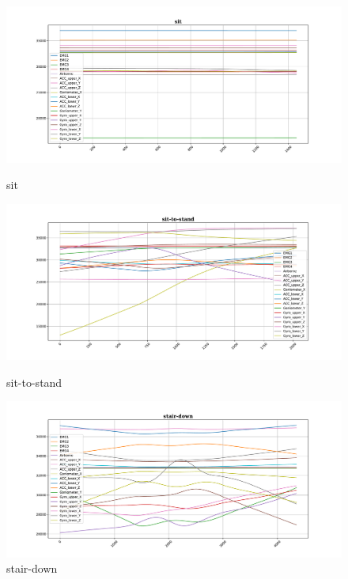 \begin{figure}[!tbp]
	\begin{minipage}[b]{0.31\textwidth}
		\includegraphics[width=\textwidth]{images/sit_example.pdf}
		\caption{sit}
		\label{sit}
	\end{minipage}
	\begin{minipage}[b]{0.31\textwidth}
		\includegraphics[width=\textwidth]{images/sit-to-stand_example.pdf}
		\caption{sit-to-stand}
	\end{minipage}
	\begin{minipage}[b]{0.31\textwidth}
		\includegraphics[width=\textwidth]{images/stair-down_example.pdf}
		\caption{stair-down}
	\end{minipage}
\end{figure}


